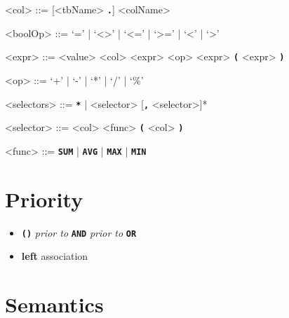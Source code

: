 \documentclass{article}
\renewcommand{\t}[1]{\texttt{\textbf{#1}}}
\begin{document}
\begin{grammar}
<col> ::= [<tbName> \t{.}] <colName>

<boolOp> ::= `=' | `<>' | `<=' | `>=' | `<' | `>'

<expr> ::= <value>
\alt <col>
\alt <expr> <op> <expr>
\alt \t{(} <expr> \t{)}

<op> ::= `+' | `-' | `*' | `/' | `\%'

<selectors> ::= \t{*} | <selector> [\t{,} <selector>]*

<selector> ::= <col>
\alt <func> \t{(} <col> \t{)}

<func> ::= \t{SUM} | \t{AVG} | \t{MAX} | \t{MIN}

\end{grammar}

\section{Priority}

\begin{itemize}
    \item \t{()} \textit{prior to} \t{AND} \textit{prior to} \t{OR}
    \item \textbf{left} association
\end{itemize}

\section{Semantics}
\end{document}
